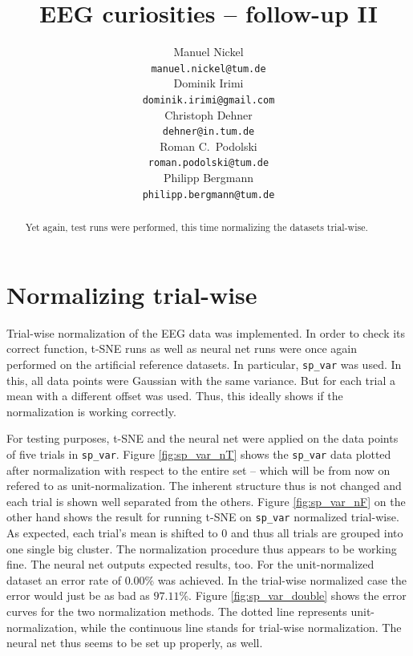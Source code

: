 \documentclass{article} %
\title{EEG curiosities -- follow-up II}
\author{
Manuel Nickel
\\
\texttt{manuel.nickel@tum.de} \\
\And
Dominik Irimi \\
\texttt{dominik.irimi@gmail.com} \\
\AND
Christoph Dehner \\
\texttt{dehner@in.tum.de} \\
\And
Roman C.~Podolski \\
\texttt{roman.podolski@tum.de} \\
\And
Philipp Bergmann \\
\texttt{philipp.bergmann@tum.de} \\
}
\begin{document}
\maketitle

\begin{abstract}
Yet again, test runs were performed, this time normalizing the datasets trial-wise.
\end{abstract}

\section{Normalizing trial-wise}
Trial-wise normalization of the EEG data was implemented. In order to check its correct function, t-SNE runs as well as neural net runs were once again performed on the artificial reference datasets. In particular, \verb|sp_var| was used. In this, all data points were Gaussian with the same variance. But for each trial a mean with a different offset was used. Thus, this ideally shows if the normalization is working correctly. 

For testing purposes, t-SNE and the neural net were applied on the data points of five trials in \verb|sp_var|. Figure \ref{fig:sp_var_nT} shows the \verb|sp_var| data plotted after normalization with respect to the entire set -- which will be from now on refered to as unit-normalization. The inherent structure thus is not changed and each trial is shown well separated from the others. Figure \ref{fig:sp_var_nF} on the other hand shows the result for running t-SNE on \verb|sp_var| normalized trial-wise. As expected, each trial's mean is shifted to $0$ and thus all trials are grouped into one single big cluster. The normalization procedure thus appears to be working fine. The neural net outputs expected results, too. For the unit-normalized dataset an error rate of $0.00\%$ was achieved. In the trial-wise normalized case the error would just be as bad as $97.11\%$. Figure \ref{fig:sp_var_double} shows the error curves for the two normalization methods. The dotted line represents unit-normalization, while the continuous line stands for trial-wise normalization. The neural net thus seems to be set up properly, as well.
\end{document}
